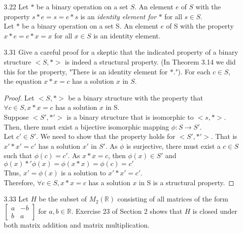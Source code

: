 \documentclass[12pt]{article}
\newcommand{\R}{\mathbb{R}}
\begin{document}
\begin{enumerate}
\begin{enumerate}
			\item[3.22] Let $*$ be a binary operation on a set $S$. An element $e$ of $S$ with the property $s * e = s = e  * s$ is an \textit{identity element for} $*$ for all $s \in S$.
			\\
			Let $*$ be a binary operation on a set S. An element $e$ of S with the property $ x*e = e*x=x $ for all $ x\in S $ is an identity element.
			\item[3.31] Give a careful proof for a skeptic that the indicated property of a binary structure $<S,*>$ is indeed a structural property. (In Theorem 3.14 we did this for the property, "There is an identity element for $*$."). For each $c \in S$, the equation $x * x = c$ has a solution $x$ in $S$.
			\begin{proof}
				Let $ <S,*> $ be a binary structure with the property that $\forall c\in S,x*x=c $ has a solution $x$ in S.\\
				Suppose $ <S',*'>$ is a binary structure that is isomorphic to $ <s,*> $. Then, there must exist a bijective isomorphic mapping $ \phi : S \rightarrow S' $.\\
				Let $ c' \in S' $. We need to show that the property holds for $ <S',*'> $. That is $ x'*x'=c' $ has a solution $ x' $ in $ S' $. As $ \phi $ is surjective, there must exist a $ c\in S $ such that $ \phi(c)=c' $. As $ x*x=c $, then $ \phi(x)\in S' $ and $ \phi(x)*'\phi(x) = \phi(x*x)=\phi(c)=c' $\\
				Thus, $ x' = \phi(x) $ is a solution to $ x'*x'=c' $.\\
				Therefore, $\forall c\in S,x*x=c $ has a solution $x$ in S is a structural property.
			\end{proof}
			\item[3.33] Let $H$ be the subset of $M_2(\R)$ consisting of all matrices of the form $\begin{bmatrix}a & -b \\b & a \end{bmatrix}$ for $a,b \in \R$. Exercise 23 of Section 2 shows that $H$ is closed under both matrix addition and matrix multiplication.
			

\end{enumerate}
\end{enumerate}
\end{document}
